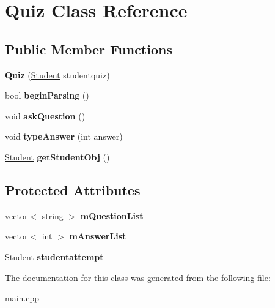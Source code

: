 \hypertarget{class_quiz}{}\section{Quiz Class Reference}
\label{class_quiz}
\subsection*{Public Member Functions}
\begin{DoxyCompactItemize}
\item 
\hypertarget{class_quiz_a2c8735bcccb0c1f2b19de4d86a4c8607}{}{\bfseries Quiz} (\hyperlink{class_student}{Student} studentquiz)\label{class_quiz_a2c8735bcccb0c1f2b19de4d86a4c8607}

\item 
\hypertarget{class_quiz_a84de8b5fae2384c5ceb369ef773c8b00}{}bool {\bfseries begin\+Parsing} ()\label{class_quiz_a84de8b5fae2384c5ceb369ef773c8b00}

\item 
\hypertarget{class_quiz_ac4dcbb081374b9ebadeceb920cd611d6}{}void {\bfseries ask\+Question} ()\label{class_quiz_ac4dcbb081374b9ebadeceb920cd611d6}

\item 
\hypertarget{class_quiz_a1761c4fed160b5e27d05914157e8fdea}{}void {\bfseries type\+Answer} (int answer)\label{class_quiz_a1761c4fed160b5e27d05914157e8fdea}

\item 
\hypertarget{class_quiz_a8d2ae4ef32698a0c47ad7d728aa9b45c}{}\hyperlink{class_student}{Student} {\bfseries get\+Student\+Obj} ()\label{class_quiz_a8d2ae4ef32698a0c47ad7d728aa9b45c}

\end{DoxyCompactItemize}
\subsection*{Protected Attributes}
\begin{DoxyCompactItemize}
\item 
\hypertarget{class_quiz_acfcab37c7c3c762d440033024c9699d0}{}vector$<$ string $>$ {\bfseries m\+Question\+List}\label{class_quiz_acfcab37c7c3c762d440033024c9699d0}

\item 
\hypertarget{class_quiz_a539bb9e449150a28c40320d009d35256}{}vector$<$ int $>$ {\bfseries m\+Answer\+List}\label{class_quiz_a539bb9e449150a28c40320d009d35256}

\item 
\hypertarget{class_quiz_adb1d94a2f14859b95e9da1f567363608}{}\hyperlink{class_student}{Student} {\bfseries studentattempt}\label{class_quiz_adb1d94a2f14859b95e9da1f567363608}

\end{DoxyCompactItemize}


The documentation for this class was generated from the following file\+:\begin{DoxyCompactItemize}
\item 
main.\+cpp\end{DoxyCompactItemize}
